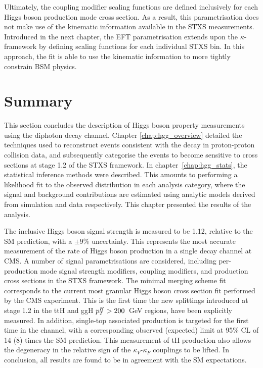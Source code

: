 Ultimately, the coupling modifier scaling functions are defined inclusively for each Higgs boson production mode cross section. As a result, this parametrisation does not make use of the kinematic information available in the STXS measurements. Introduced in the next chapter, the EFT parametrisation extends upon the $\kappa$-framework by defining scaling functions for each individual STXS bin. In this approach, the fit is able to use the kinematic information to more tightly constrain BSM physics.

\section{Summary}
This section concludes the description of Higgs boson property measurements using the diphoton decay channel. Chapter \ref{chap:hgg_overview} detailed the techniques used to reconstruct events consistent with the \Hgg decay in proton-proton collision data, and subsequently categorise the events to become sensitive to cross sections at stage 1.2 of the STXS framework. In chapter~\ref{chap:hgg_stats}, the statistical inference methods were described. This amounts to performing a likelihood fit to the observed \mgg distribution in each analysis category, where the signal and background contributions are estimated using analytic models derived from simulation and data respectively. This chapter presented the results of the analysis.

The inclusive Higgs boson signal strength is measured to be 1.12, relative to the SM prediction, with a $\pm 9\%$ uncertainty. This represents the most accurate measurement of the rate of Higgs boson production in a single decay channel at CMS. A number of signal parametrisations are considered, including per-production mode signal strength modifiers, coupling modifiers, and production cross sections in the STXS framework. The minimal merging scheme fit corresponds to the current most granular Higgs boson cross section fit performed by the CMS experiment. This is the first time the new splittings introduced at stage 1.2 in the ttH and ggH $p_T^H>200$~GeV regions, have been explicitly measured. In addition, single-top associated production is targeted for the first time in the \Hgg channel, with a corresponding observed (expected) limit at 95\% CL of 14 (8) times the SM prediction. This measurement of tH production also allows the degeneracy in the relative sign of the $\kappa_V$-$\kappa_F$ couplings to be lifted. In conclusion, all results are found to be in agreement with the SM expectations.